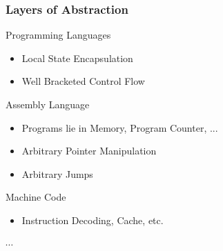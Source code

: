 \documentclass{beamer}
\begin{document}
\begin{frame}
\frametitle{Layers of Abstraction}

\begin{block}{Programming Languages}
	\begin{itemize}
		\item<2-> Local State Encapsulation
		\item<3-> Well Bracketed Control Flow
	\end{itemize}
\end{block}

\begin{block}{Assembly Language}
	\begin{itemize}
		\item<4-> Programs lie in Memory, Program Counter, ...
		\item<5-> Arbitrary Pointer Manipulation
		\item<6-> Arbitrary Jumps
	\end{itemize}
\end{block}

\begin{block}{Machine Code}
	\begin{itemize}
		\item<7-> Instruction Decoding, Cache, etc. 
	\end{itemize}
\end{block}

\begin{block}{$\cdots$}
\end{block}

\end{frame}

\end{document}
